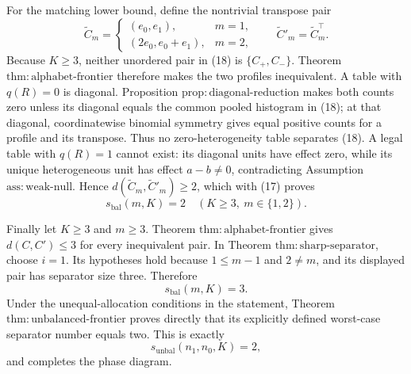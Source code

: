 For the matching lower bound, define the nontrivial transpose pair
\[
\widetilde C_m=
\begin{cases}
(e_0,e_1),&m=1,\\
(2e_0,e_0+e_1),&m=2,
\end{cases}
\qquad
\widetilde C'_m=\widetilde C_m^\top. \tag{18}
\]
Because \(K\geq3\), neither unordered pair in (18) is \(\{C_+,C_-\}\). Theorem \(\mathrm{thm{:}alphabet\text{-}frontier}\) therefore makes the two profiles inequivalent. A table with \(q(R)=0\) is diagonal. Proposition \(\mathrm{prop{:}diagonal\text{-}reduction}\) makes both counts zero unless its diagonal equals the common pooled histogram in (18); at that diagonal, coordinatewise binomial symmetry gives equal positive counts for a profile and its transpose. Thus no zero-heterogeneity table separates (18). A legal table with \(q(R)=1\) cannot exist: its diagonal units have effect zero, while its unique heterogeneous unit has effect \(a-b\neq0\), contradicting Assumption \(\mathrm{ass{:}weak\text{-}null}\). Hence \(d(\widetilde C_m,\widetilde C'_m)\geq2\), which with (17) proves
\[
s_{\mathrm{bal}}(m,K)=2
\quad(K\geq3,\ m\in\{1,2\}). \tag{19}
\]

Finally let \(K\geq3\) and \(m\geq3\). Theorem \(\mathrm{thm{:}alphabet\text{-}frontier}\) gives \(d(C,C')\leq3\) for every inequivalent pair. In Theorem \(\mathrm{thm{:}sharp\text{-}separator}\), choose \(i=1\). Its hypotheses hold because \(1\leq m-1\) and \(2\neq m\), and its displayed pair has separator size three. Therefore
\[
s_{\mathrm{bal}}(m,K)=3. \tag{20}
\]
Under the unequal-allocation conditions in the statement, Theorem \(\mathrm{thm{:}unbalanced\text{-}frontier}\) proves directly that its explicitly defined worst-case separator number equals two. This is exactly
\[
s_{\mathrm{unbal}}(n_1,n_0,K)=2, \tag{21}
\]
and completes the phase diagram.
